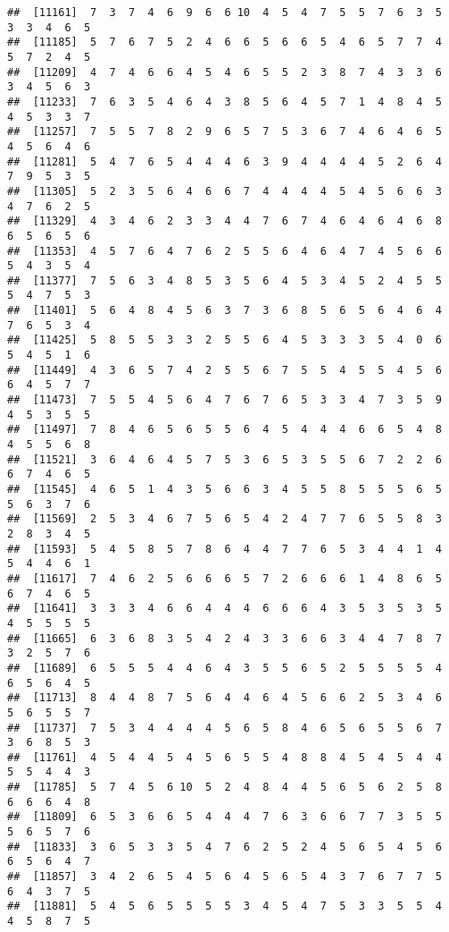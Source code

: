 \documentclass[
]{book}
\begin{document}
\begin{verbatim}
##  [11161]  7  3  7  4  6  9  6  6 10  4  5  4  7  5  5  7  6  3  5  3  3  4  6  5
##  [11185]  5  7  6  7  5  2  4  6  6  5  6  6  5  4  6  5  7  7  4  5  7  2  4  5
##  [11209]  4  7  4  6  6  4  5  4  6  5  5  2  3  8  7  4  3  3  6  3  4  5  6  3
##  [11233]  7  6  3  5  4  6  4  3  8  5  6  4  5  7  1  4  8  4  5  4  5  3  3  7
##  [11257]  7  5  5  7  8  2  9  6  5  7  5  3  6  7  4  6  4  6  5  4  5  6  4  6
##  [11281]  5  4  7  6  5  4  4  4  6  3  9  4  4  4  4  5  2  6  4  7  9  5  3  5
##  [11305]  5  2  3  5  6  4  6  6  7  4  4  4  4  5  4  5  6  6  3  4  7  6  2  5
##  [11329]  4  3  4  6  2  3  3  4  4  7  6  7  4  6  4  6  4  6  8  6  5  6  5  6
##  [11353]  4  5  7  6  4  7  6  2  5  5  6  4  6  4  7  4  5  6  6  5  4  3  5  4
##  [11377]  7  5  6  3  4  8  5  3  5  6  4  5  3  4  5  2  4  5  5  5  4  7  5  3
##  [11401]  5  6  4  8  4  5  6  3  7  3  6  8  5  6  5  6  4  6  4  7  6  5  3  4
##  [11425]  5  8  5  5  3  3  2  5  5  6  4  5  3  3  3  5  4  0  6  5  4  5  1  6
##  [11449]  4  3  6  5  7  4  2  5  5  6  7  5  5  4  5  5  4  5  6  6  4  5  7  7
##  [11473]  7  5  5  4  5  6  4  7  6  7  6  5  3  3  4  7  3  5  9  4  5  3  5  5
##  [11497]  7  8  4  6  5  6  5  5  6  4  5  4  4  4  6  6  5  4  8  4  5  5  6  8
##  [11521]  3  6  4  6  4  5  7  5  3  6  5  3  5  5  6  7  2  2  6  6  7  4  6  5
##  [11545]  4  6  5  1  4  3  5  6  6  3  4  5  5  8  5  5  5  6  5  5  6  3  7  6
##  [11569]  2  5  3  4  6  7  5  6  5  4  2  4  7  7  6  5  5  8  3  2  8  3  4  5
##  [11593]  5  4  5  8  5  7  8  6  4  4  7  7  6  5  3  4  4  1  4  5  4  4  6  1
##  [11617]  7  4  6  2  5  6  6  6  5  7  2  6  6  6  1  4  8  6  5  6  7  4  6  5
##  [11641]  3  3  3  4  6  6  4  4  4  6  6  6  4  3  5  3  5  3  5  4  5  5  5  5
##  [11665]  6  3  6  8  3  5  4  2  4  3  3  6  6  3  4  4  7  8  7  3  2  5  7  6
##  [11689]  6  5  5  5  4  4  6  4  3  5  5  6  5  2  5  5  5  5  4  6  5  6  4  5
##  [11713]  8  4  4  8  7  5  6  4  4  6  4  5  6  6  2  5  3  4  6  5  6  5  5  7
##  [11737]  7  5  3  4  4  4  4  5  6  5  8  4  6  5  6  5  5  6  7  3  6  8  5  3
##  [11761]  4  5  4  4  5  4  5  6  5  5  4  8  8  4  5  4  5  4  4  5  5  4  4  3
##  [11785]  5  7  4  5  6 10  5  2  4  8  4  4  5  6  5  6  2  5  8  6  6  6  4  8
##  [11809]  6  5  3  6  6  5  4  4  4  7  6  3  6  6  7  7  3  5  5  5  6  5  7  6
##  [11833]  3  6  5  3  3  5  4  7  6  2  5  2  4  5  6  5  4  5  6  6  5  6  4  7
##  [11857]  3  4  2  6  5  4  5  6  4  5  6  5  4  3  7  6  7  7  5  6  4  3  7  5
##  [11881]  5  4  5  6  5  5  5  5  3  4  5  4  7  5  3  3  5  5  4  4  5  8  7  5

\end{verbatim}
\end{document}
